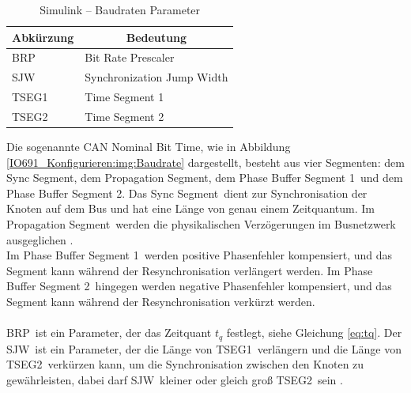 \pagebreak[1]
\begin{table}[!ht]
	\centering
	\caption{Simulink – Baudraten Parameter }
	\label{IO691_Konfigurieren:tab:Baudraten}
	\begin{tabular}{ll}
		\hline
		\multicolumn{1}{c}{\textbf{Abkürzung}} & \multicolumn{1}{c}{\textbf{Bedeutung}} \\ \hline
		\multicolumn{1}{l|}{BRP}               & Bit Rate Prescaler                     \\
		\multicolumn{1}{l|}{SJW}               & Synchronization Jump Width             \\
		\multicolumn{1}{l|}{TSEG1}             & Time Segment 1                         \\
		\multicolumn{1}{l|}{TSEG2}             & Time Segment 2                         \\ \hline
	\end{tabular}
\end{table}
\pagebreak[1]



Die sogenannte \frqq CAN Nominal Bit Time\flqq, wie in Abbildung \ref{IO691_Konfigurieren:img:Baudrate} dargestellt, besteht aus vier Segmenten: dem \frqq Sync Segment\flqq, dem \frqq Propagation Segment\flqq, dem \frqq Phase Buffer Segment 1\flqq\ und dem \frqq Phase Buffer Segment 2\flqq.
Das \frqq Sync Segment\flqq\ dient zur Synchronisation der Knoten auf dem Bus und hat eine Länge von genau einem Zeitquantum.
Im \frqq Propagation Segment\flqq\ werden die physikalischen Verzögerungen im Busnetzwerk ausgeglichen \cite[1]{microchip:CANModule}.\\
Im \frqq Phase Buffer Segment 1\flqq\ werden positive Phasenfehler kompensiert, und das Segment kann während der Resynchronisation verlängert werden. Im \frqq Phase Buffer Segment 2\flqq\ hingegen werden negative Phasenfehler kompensiert, und das Segment kann während der Resynchronisation verkürzt werden.\\ \ \\



\frqq BRP\flqq\ ist ein Parameter, der das Zeitquant $t_q$ festlegt, siehe Gleichung \ref{eq:tq}.
Der \frqq SJW\flqq\ ist ein Parameter, der die Länge von \frqq TSEG1\flqq\ verlängern und die Länge von \frqq TSEG2\flqq\ verkürzen kann, um die Synchronisation zwischen den Knoten zu gewährleisten, dabei darf \frqq SJW\flqq\ kleiner oder gleich groß \frqq TSEG2\flqq\ sein \cite{speedgoat:IO691:CAN_Message}.

